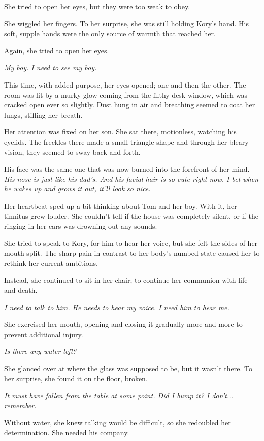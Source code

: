 She tried to open her eyes, but they were too weak to obey.

She wiggled her fingers. To her surprise, she was still holding Kory's hand. His soft, supple hands were the only source of warmth that reached her.

Again, she tried to open her eyes.

\textit{My boy. I need to see my boy.}

This time, with added purpose, her eyes opened; one and then the other. The room was lit by a murky glow coming from the filthy desk window, which was cracked open ever so slightly. Dust hung in air and breathing seemed to coat her lungs, stifling her breath.

Her attention was fixed on her son. She sat there, motionless, watching his eyelids. The freckles there made a small triangle shape and through her bleary vision, they seemed to sway back and forth.

His face was the same one that was now burned into the forefront of her mind. \textit{His nose is just like his dad's. And his facial hair is so cute right now. I bet when he wakes up and grows it out, it'll look so nice.}

Her heartbeat sped up a bit thinking about Tom and her boy. With it, her tinnitus grew louder. She couldn't tell if the house was completely silent, or if the ringing in her ears was drowning out any sounds.

She tried to speak to Kory, for him to hear her voice, but she felt the sides of her mouth split. The sharp pain in contrast to her body's numbed state caused her to rethink her current ambitions.

Instead, she continued to sit in her chair; to continue her communion with life and death.

\textit{I need to talk to him. He needs to hear my voice. I need him to hear me.}

She exercised her mouth, opening and closing it gradually more and more to prevent additional injury.

\textit{Is there any water left?}

She glanced over at where the glass was supposed to be, but it wasn't there. To her surprise, she found it on the floor, broken.

\textit{It must have fallen from the table at some point. Did I bump it? I don't... remember.}

Without water, she knew talking would be difficult, so she redoubled her determination. She needed his company.

